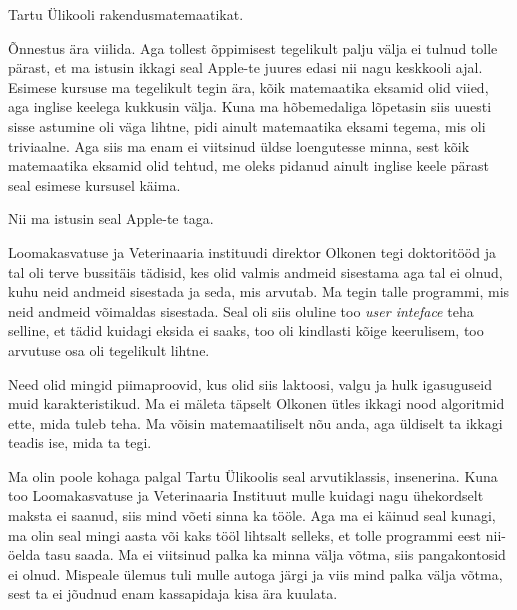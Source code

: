 
Tartu Ülikooli rakendusmatemaatikat. 


Õnnestus ära viilida. Aga tollest õppimisest tegelikult palju välja ei tulnud 
tolle pärast, et ma istusin ikkagi seal Apple-te juures edasi nii nagu 
keskkooli ajal. Esimese kursuse ma tegelikult tegin ära, kõik matemaatika 
eksamid olid viied, aga inglise keelega kukkusin välja. Kuna ma hõbemedaliga 
lõpetasin  siis uuesti sisse astumine oli väga lihtne, pidi ainult matemaatika 
eksami tegema, mis oli triviaalne. Aga siis ma enam ei viitsinud üldse 
loengutesse minna, sest  kõik matemaatika eksamid olid tehtud, me oleks pidanud 
ainult inglise keele pärast seal esimese kursusel käima.

Nii ma istusin seal Apple-te taga. 

Loomakasvatuse ja Veterinaaria instituudi direktor Olkonen tegi 
doktoritööd ja tal oli terve bussitäis tädisid, kes olid valmis andmeid 
sisestama aga tal ei olnud, kuhu neid andmeid sisestada ja seda, mis arvutab. 
Ma tegin talle  programmi, mis neid andmeid võimaldas sisestada. Seal oli siis 
oluline too \emph{user inteface} teha selline, et tädid kuidagi eksida ei 
saaks, too oli kindlasti kõige keerulisem, too arvutuse osa oli  tegelikult 
lihtne.


Need olid mingid piimaproovid, kus olid siis laktoosi, valgu ja hulk 
igasuguseid muid karakteristikud.  Ma ei mäleta täpselt Olkonen ütles ikkagi 
nood algoritmid ette, mida tuleb teha. Ma võisin matemaatiliselt nõu anda, aga  
üldiselt ta ikkagi teadis ise, mida ta tegi. 


Ma olin poole kohaga palgal Tartu Ülikoolis seal arvutiklassis,  insenerina. 
Kuna too Loomakasvatuse ja Veterinaaria Instituut mulle kuidagi nagu 
ühekordselt maksta ei saanud, siis mind võeti sinna ka tööle. Aga ma ei käinud 
seal kunagi, ma olin seal mingi aasta või kaks tööl lihtsalt selleks, et tolle 
programmi eest nii-öelda tasu saada. Ma ei viitsinud palka ka minna välja 
võtma,  siis pangakontosid ei olnud. Mispeale ülemus tuli mulle autoga järgi ja 
viis mind palka välja võtma, sest ta ei jõudnud enam  kassapidaja kisa ära 
kuulata.


